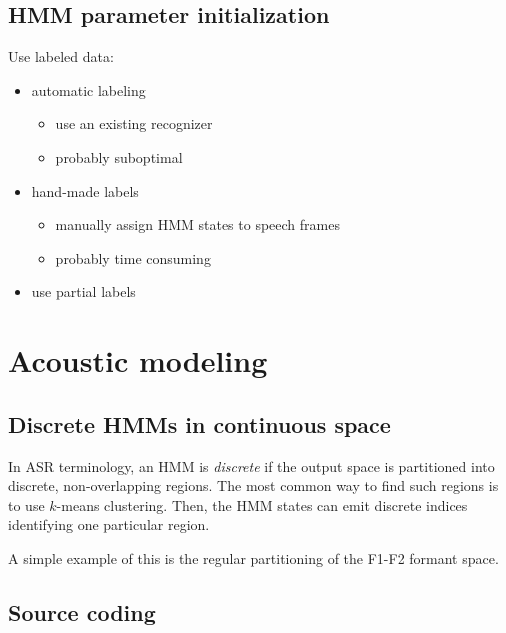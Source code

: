 \documentclass[11pt]{article}
\begin{document}
\subsection{HMM parameter initialization}

Use labeled data:
\begin{itemize}
    \item automatic labeling
        \begin{itemize}
            \item use an existing recognizer
            \item probably suboptimal
        \end{itemize}
    \item hand-made labels
        \begin{itemize}
            \item manually assign HMM states to speech frames
            \item probably time consuming
        \end{itemize}
    \item use partial labels
\end{itemize}

\newpage

\section{Acoustic modeling}

\subsection{Discrete HMMs in continuous space}

In ASR terminology, an HMM is \textit{discrete} if the output space is partitioned into discrete, non-overlapping regions. The most common way to find such regions is to use $k$-means clustering. Then, the HMM states can emit discrete indices identifying one particular region.

A simple example of this is the regular partitioning of the F1-F2 formant space.

\subsection{Source coding}
\end{document}
